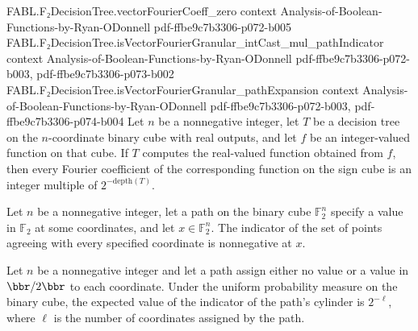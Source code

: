 \begin{theorem}
\proofstep
  {FABL.F₂DecisionTree.vectorFourierCoeff_zero}
  {context}
  {Analysis-of-Boolean-Functions-by-Ryan-ODonnell}
  {pdf-ffbe9c7b3306-p072-b005}
\proofstep
  {FABL.F₂DecisionTree.isVectorFourierGranular_intCast_mul_pathIndicator}
  {context}
  {Analysis-of-Boolean-Functions-by-Ryan-ODonnell}
  {pdf-ffbe9c7b3306-p072-b003,
    pdf-ffbe9c7b3306-p073-b002}
\proofstep
  {FABL.F₂DecisionTree.isVectorFourierGranular_pathExpansion}
  {context}
  {Analysis-of-Boolean-Functions-by-Ryan-ODonnell}
  {pdf-ffbe9c7b3306-p072-b003,
    pdf-ffbe9c7b3306-p074-b004}
Let $n$ be a nonnegative integer, let $T$ be a decision tree on the $n$-coordinate
binary cube with real outputs, and let $f$ be an integer-valued function on that cube.
If $T$ computes the real-valued function obtained from $f$, then every Fourier
coefficient of the corresponding function on the sign cube is an integer multiple of
$2^{-\mathrm{depth}(T)}$.
\end{theorem}

\begin{theorem}
\leanok
{}
Let $n$ be a nonnegative integer, let a path on the binary cube $\mathbb{F}_2^n$
specify a value in $\mathbb{F}_2$ at some coordinates, and let $x\in\mathbb{F}_2^n$. The
indicator of the set of points agreeing with every specified coordinate is nonnegative
at $x$.
\end{theorem}

\begin{theorem}
\leanok
{}
Let $n$ be a nonnegative integer and let a path assign either no value or a value in
$\bbr/2\bbr$ to each coordinate. Under the uniform probability measure on the binary
cube, the expected value of the indicator of the path’s cylinder is $2^{-\ell}$, where
$\ell$ is the number of coordinates assigned by the path.
\end{theorem}

